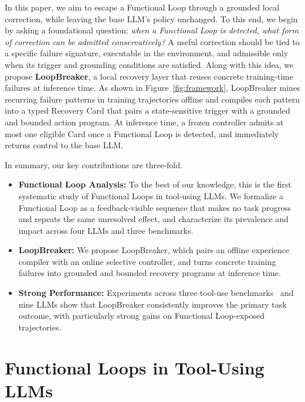 \documentclass[letterpaper]{article}
\begin{document}
In this paper, we aim to escape a Functional Loop through a grounded local correction, while leaving the base LLM's policy unchanged. To this end, we begin by asking a foundational question: \emph{when a Functional Loop is detected, what form of correction can be admitted conservatively?} A useful correction should be tied to a specific failure signature, executable in the environment, and admissible only when its trigger and grounding conditions are satisfied. Along with this idea, we propose \textbf{LoopBreaker}, a local recovery layer that reuses concrete training-time failures at inference time. As shown in Figure~\ref{fig:framework}, LoopBreaker mines recurring failure patterns in training trajectories offline and compiles each pattern into a typed Recovery Card that pairs a state-sensitive trigger with a grounded and bounded action program. At inference time, a frozen controller admits at most one eligible Card once a Functional Loop is detected, and immediately returns control to the base LLM.

In summary, our key contributions are three-fold.
\begin{itemize}[leftmargin=1em, itemsep=-1ex, topsep=0.2ex]
    \item \textbf{Functional Loop Analysis:} To the best of our knowledge, this is the first systematic study of Functional Loops in tool-using LLMs. We formalize a Functional Loop as a feedback-visible sequence that makes no task progress and repeats the same unresolved effect, and characterize its prevalence and impact across four LLMs and three benchmarks.
    \item \textbf{LoopBreaker:} We propose LoopBreaker, which pairs an offline experience compiler with an online selective controller, and turns concrete training failures into grounded and bounded recovery programs at inference time.
    \item \textbf{Strong Performance:} Experiments across three tool-use benchmarks~\citep{lu2025toolsandbox,zhang2026deepplanning,shi2026tauknowledge} and nine LLMs show that LoopBreaker consistently improves the primary task outcome, with particularly strong gains on Functional Loop-exposed trajectories.
\end{itemize}


\section{Functional Loops in Tool-Using LLMs}
\label{sec:functional-loops}
\end{document}
